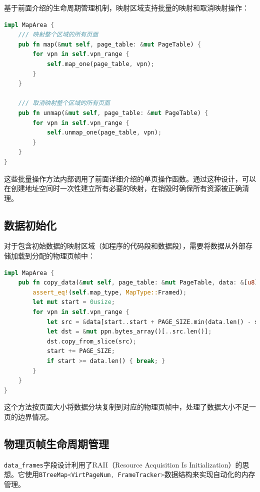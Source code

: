 基于前面介绍的生命周期管理机制，映射区域支持批量的映射和取消映射操作：

\begin{lstlisting}[language=Rust,caption={批量映射操作}, label={lst:map-area-batch}]
impl MapArea {
    /// 映射整个区域的所有页面
    pub fn map(&mut self, page_table: &mut PageTable) {
        for vpn in self.vpn_range {
            self.map_one(page_table, vpn);
        }
    }
    
    /// 取消映射整个区域的所有页面  
    pub fn unmap(&mut self, page_table: &mut PageTable) {
        for vpn in self.vpn_range {
            self.unmap_one(page_table, vpn);
        }
    }
}
\end{lstlisting}

这些批量操作方法内部调用了前面详细介绍的单页操作函数。通过这种设计，可以在创建地址空间时一次性建立所有必要的映射，在销毁时确保所有资源被正确清理。

\subsection{数据初始化}

对于包含初始数据的映射区域（如程序的代码段和数据段），需要将数据从外部存储加载到分配的物理页帧中：

\begin{lstlisting}[language=Rust,caption={映射区域数据复制}, label={lst:map-area-copy}]
impl MapArea {
    pub fn copy_data(&mut self, page_table: &mut PageTable, data: &[u8]) {
        assert_eq!(self.map_type, MapType::Framed);
        let mut start = 0usize;
        for vpn in self.vpn_range {
            let src = &data[start..start + PAGE_SIZE.min(data.len() - start)];
            let dst = &mut ppn.bytes_array()[..src.len()];
            dst.copy_from_slice(src);
            start += PAGE_SIZE;
            if start >= data.len() { break; }
        }
    }
}
\end{lstlisting}

这个方法按页面大小将数据分块复制到对应的物理页帧中，处理了数据大小不足一页的边界情况。

\subsection{物理页帧生命周期管理}

\lstinline[language=Rust]{data_frames}字段设计利用了RAII（Resource Acquisition Is Initialization）的思想。它使用\lstinline[language=Rust]{BTreeMap<VirtPageNum, FrameTracker>}数据结构来实现自动化的内存管理。

